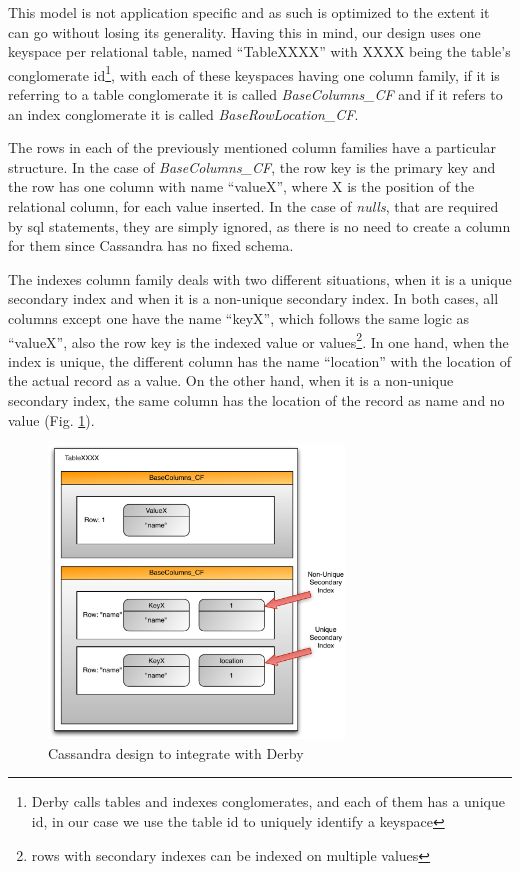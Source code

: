 This model is not application specific and as such is optimized to the extent it can go without losing its generality. Having this in mind, our design uses one keyspace per relational table, named ``TableXXXX'' with XXXX being the table's conglomerate id\footnote{Derby calls tables and indexes conglomerates, and each of them has a unique id, in our case we use the table id to uniquely identify a keyspace}, with each of these keyspaces having one column family, if it is referring to a table conglomerate it is called \emph{BaseColumns\_CF} and if it refers to an index conglomerate it is called \emph{BaseRowLocation\_CF}.

The rows in each of the previously mentioned column families have a particular structure. In the case of \emph{BaseColumns\_CF}, the row key is the primary key and the row has one column with name ``valueX'', where X is the position of the relational column, for each value inserted. In the case of \emph{nulls}, that are required by \ac{sql} statements, they are simply ignored, as there is no need to create a column for them since Cassandra has no fixed schema.  

The indexes column family deals with two different situations, when it is a unique secondary index and when it is a non-unique secondary index. In both cases, all columns except one have the name ``keyX'', which follows the same logic as ``valueX'', also the row key is the indexed value or values\footnote{rows with secondary indexes can be indexed on multiple values}. In one hand, when the index is unique, the different column has the name ``location'' with the location of the actual record as a value. On the other hand, when it is a non-unique secondary index, the same column has the location of the record as name and no value (Fig. \ref{fig:mymodel}).

\begin{figure}[htb]
  \begin{center}
    \leavevmode
    \includegraphics[width=0.7\textwidth]{images/mymodel}
  \end{center}
  \caption{Cassandra design to integrate with Derby}
  \label{fig:mymodel}
\end{figure}

